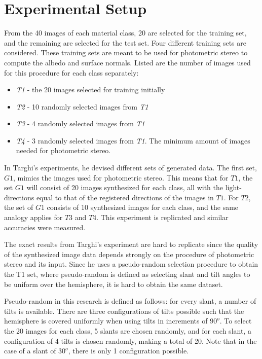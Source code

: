 \section{Experimental Setup}\label{sec:Experiments}
From the 40 images of each material class, 20 are selected for the training set, and the remaining are selected for the test set. Four different training sets are considered. These training sets are meant to be used for photometric stereo to compute the albedo and surface normals. Listed are the number of images used for this procedure for each class separately:

\begin{itemize}
	\item{\textit{T1} - the 20 images selected for training initially}
	\item{\textit{T2} - 10 randomly selected images from \textit{T1}}
	\item{\textit{T3} - 4 randomly selected images from \textit{T1}}
	\item{\textit{T4} - 3 randomly selected images from \textit{T1}. The minimum amount of images needed for photometric stereo.}
\end{itemize}

In Targhi's experiments, he devised different sets of generated data. The first set, $G1$, mimics the images used for photometric stereo. This means that for $T1$, the set $G1$ will consist of 20 images synthesized for each class, all with the light-directions equal to that of the registered directions of the images in $T1$. For $T2$, the set of $G1$ consists of 10 synthesized images for each class, and the same analogy applies for $T3$ and $T4$. This experiment is replicated and similar accuracies were measured.

The exact results from Targhi's experiment are hard to replicate since the quality of the synthesized image data depends strongly on the procedure of photometric stereo and its input. Since he uses a pseudo-random selection procedure to obtain the T1 set, where pseudo-random is defined as selecting slant and tilt angles to be uniform over the hemisphere, it is hard to obtain the same dataset. 

Pseudo-random in this research is defined as follows: for every slant, a number of tilts is available. There are three configurations of tilts possible such that the hemisphere is covered uniformly when using tilts in increments of $90^o$. To select the 20 images for each class, 5 slants are chosen randomly, and for each slant, a configuration of 4 tilts is chosen randomly, making a total of 20. Note that in the case of a slant of $30^o$, there is only 1 configuration possible. 

